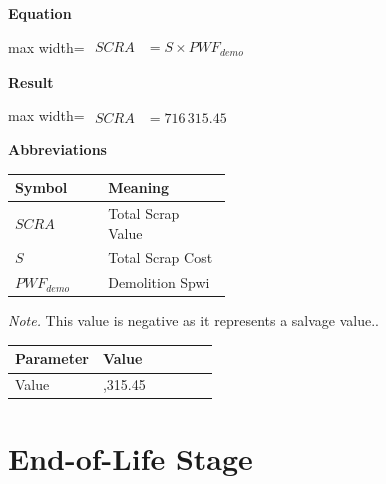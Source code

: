 \documentclass{article}
\begin{document}
\vspace{0.4em}
\textbf{Equation}\par\vspace{-0.35em}
\begin{center}
\begin{adjustbox}{max width=\linewidth}
$\displaystyle\begin{aligned}
SCRA &= S \times PWF_{demo}
\end{aligned}$
\end{adjustbox}
\end{center}
\vspace{0.4em}
\textbf{Result}\par\vspace{-0.35em}
\begin{center}
\begin{adjustbox}{max width=\linewidth}
$\displaystyle\begin{aligned}
SCRA &= 716\,315.45
\end{aligned}$
\end{adjustbox}
\end{center}
\vspace{0.4em}
\textbf{Abbreviations}\par\vspace{-0.35em}
\begin{tabularx}{\linewidth}{>{\raggedright\arraybackslash}p{0.43\linewidth} >{\raggedright\arraybackslash}X}
\toprule
Symbol & Meaning \\
\midrule
$SCRA$ & Total Scrap Value \\
$S$ & Total Scrap Cost \\
$PWF_{demo}$ & Demolition Spwi \\
\bottomrule
\end{tabularx}
\vspace{0.6em}
\textit{Note.} This value is negative as it represents a salvage value..

\begin{tabularx}{\linewidth}{>{\raggedright\arraybackslash}p{0.43\linewidth} >{\raggedright\arraybackslash}X}
\toprule
Parameter & Value \\
\midrule
Value & 716,315.45 \\
\bottomrule
\end{tabularx}
\vspace{0.6em}
\clearpage
\section{End-of-Life Stage}
\end{document}
